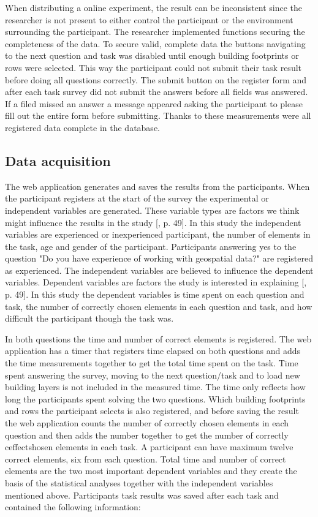 When distributing a online experiment, the result can be inconsistent since the researcher is not present to either control the participant or the environment surrounding the participant. The researcher implemented functions securing the completeness of the data. To secure valid, complete data the buttons navigating to the next question and task was disabled until enough building footprints or rows were selected. This way the participant could not submit their task result before doing all questions correctly. The submit button on the register form and after each task survey did not submit the answers before all fields was answered. If a filed missed an answer a message appeared asking the participant to please fill out the entire form before submitting. Thanks to these measurements were all registered data complete in the database. 


\subsection{Data acquisition}
The web application generates and saves the results from the participants. When the participant registers at the start of the survey the experimental or independent variables are generated. These variable types are factors we think might influence the results in the study [\citep{Kitchin2000}, p. 49]. In this study the independent variables are experienced or inexperienced participant, the number of elements in the task, age and gender of the participant. Participants answering yes to the question "Do you have experience of working with geospatial data?" are registered as experienced. The independent variables are believed to influence the dependent variables. Dependent variables are factors the study is interested in explaining [\citep{Kitchin2000}, p. 49]. In this study the dependent variables is time spent on each question and task, the number of correctly chosen elements in each question and task, and how difficult the participant though the task was. 

In both questions the time and number of correct elements is registered. The web application has a timer that registers time elapsed on both questions and adds the time measurements together to get the total time spent on the task. Time spent answering the survey, moving to the next question/task and to load new building layers is not included in the measured time. The time only reflects how long the participants spent solving the two questions. Which building footprints and rows the participant selects is also registered, and before saving the result the web application counts the number of correctly chosen elements in each question and then adds the number together to get the number of correctly ceffectshosen elements in each task. A participant can have maximum twelve correct elements, six from each question. Total time and number of correct elements are the two most important dependent variables and they create the basis of the statistical analyses together with the independent variables mentioned above. Participants task results was saved after each task and contained the following information:

